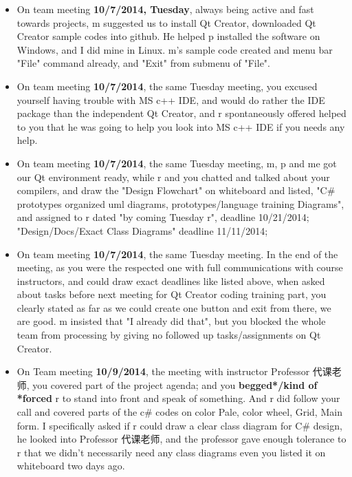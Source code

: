 \documentclass[12pt]{book}
\begin{document}
\begin{itemize}
\item On team meeting \textbf{10/7/2014, Tuesday}, always being active and fast towards projects, m suggested us to install Qt Creator, downloaded Qt Creator sample codes into github. He helped p installed the software on Windows, and I did mine in Linux. m's sample code created and menu bar "File" command already, and "Exit" from submenu of "File".
\item On team meeting \textbf{10/7/2014}, the same Tuesday meeting, you excused yourself having trouble with MS c++ IDE, and would do rather the IDE package than the independent Qt Creator, and r spontaneously offered helped to you that he was going to help you look into MS c++ IDE if you needs any help.

\item On team meeting \textbf{10/7/2014}, the same Tuesday meeting, m, p and me got our Qt environment ready, while r and you chatted and talked about your compilers, and draw the "Design Flowchart" on whiteboard and listed, "C\# prototypes organized uml diagrams, prototypes/language training Diagrams", and assigned to r dated "by coming Tuesday r", deadline 10/21/2014; "Design/Docs/Exact Class Diagrams" deadline 11/11/2014;

\item On team meeting \textbf{10/7/2014}, the same Tuesday meeting. In the end of the meeting, as you were the respected one with full communications with course instructors, and could draw exact deadlines like listed above, when asked about tasks before next meeting for Qt Creator coding training part, you clearly stated as far as we could create one button and exit from there, we are good. m insisted that "I already did that", but you blocked the whole team from processing by giving no followed up tasks/assignments on Qt Creator.

\item On Team meeting \textbf{10/9/2014}, the meeting with instructor Professor 代课老师, you covered part of the project agenda; and you \textbf{begged*/kind of *forced} r to stand into front and speak of something. And r did follow your call and covered parts of the c\# codes on color Pale, color wheel, Grid, Main form. I specifically asked if r could draw a clear class diagram for C\# design, he looked into Professor 代课老师, and the professor gave enough tolerance to r that we didn't necessarily need any class diagrams even you listed it on whiteboard two days ago.


\end{itemize}
\end{document}
